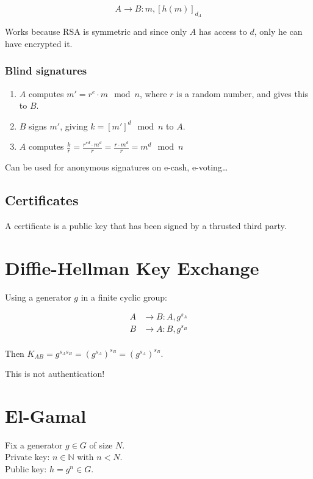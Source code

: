\documentclass{article}
\begin{document}
\[
  A \longrightarrow B : m, [h(m)]_{d_A}
\]

Works because RSA is symmetric and since only $A$ has access to $d$, only he
can have encrypted it.

\subsubsection{Blind signatures}

\begin{enumerate}
  \item $A$ computes $m' = r^e \cdot m \mod n$, where $r$ is a random number, and gives
    this to $B$.
  \item $B$ signs $m'$, giving $k = [m']^d \mod n$ to $A$.
  \item $A$ computes $\frac{k}{r} = \frac{r^{ed} \cdot m^d}{r} = \frac{r \cdot m^d}{r} = m^d \mod n$
\end{enumerate}

Can be used for anonymous signatures on e-cash, e-voting\dots

\subsection{Certificates}
A certificate is a public key that has been signed by a thrusted third party.

\section{Diffie-Hellman Key Exchange}

Using a generator $g$ in a finite cyclic group:

\begin{align*}
  A &\longrightarrow B: A, g^{s_A} \\
  B &\longrightarrow A: B, g^{s_B} \\
\end{align*}

Then $K_{AB} = g^{s_A s_B} = (g^{s_A})^{s_B} = (g^{s_A})^{s_B}$.

This is not authentication!

\section{El-Gamal}
Fix a generator $g \in G$ of size $N$. \\
Private key: $n \in \mathbb{N}$ with $n < N$. \\
Public key: $h = g^n \in G$.
\end{document}
